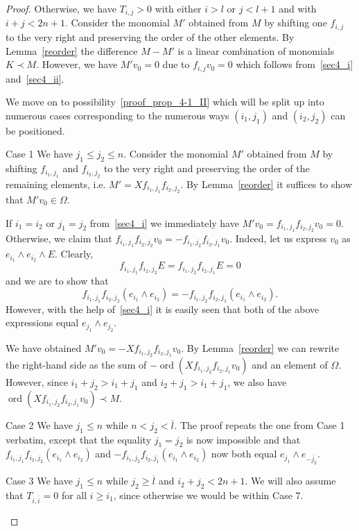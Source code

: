 \documentclass[ALCO,ThmDefs,Unicode]{cedram}
\DeclareMathOperator{\ord}{ord}
\begin{document}
\begin{proof}
Otherwise, we have $T_{i,j}>0$ with either $i>l$ or $j<l+1$ and with $i+j<2n+1$. Consider the monomial $M'$ obtained from $M$ by shifting one $f_{i,j}$ to the very right and preserving the order of the other elements. By Lemma~\ref{reorder} the difference $M-M'$ is a linear combination of monomials $K\prec M$. However, we have $M'v_0=0$ due to $f_{i,j}v_0=0$ which follows from~\ref{sec4_i} and~\ref{sec4_ii}.

We move on to possibility~\ref{proof_prop_4-1_II} which will be split up into numerous cases corresponding to the numerous ways $(i_1,j_1)$ and $(i_2,j_2)$ can be positioned.

\begin{enonce*}[remark]{Case 1} We have $j_1\le j_2\le n$. Consider the monomial $M'$ obtained from $M$ by shifting $f_{i_1,j_1}$ and $f_{i_2,j_2}$ to the very right and preserving the order of the remaining elements, i.e. $M'=X f_{i_1,j_1}f_{i_2,j_2}$. By Lemma~\ref{reorder} it suffices to show that $M'v_0\in\Omega$.

If $i_1=i_2$ or $j_1=j_2$ from~\ref{sec4_i} we immediately have $M'v_0=f_{i_1,j_1}f_{i_2,j_2}v_0=0$. Otherwise, we claim that $f_{i_1,j_1}f_{i_2,j_2} v_0=-f_{i_1,j_2}f_{i_2,j_1}v_0$. Indeed, let us express $v_0$ as $e_{i_1}\wedge e_{i_2}\wedge E$. Clearly,
\[
f_{i_1,j_1}f_{i_2,j_2} E=f_{i_1,j_2}f_{i_2,j_1}E=0
\]
and we are to show that
\[
f_{i_1,j_1}f_{i_2,j_2}(e_{i_1}\wedge e_{i_2})=-f_{i_1,j_2}f_{i_2,j_1}(e_{i_1}\wedge e_{i_2}).
\]
However, with the help of~\ref{sec4_i} it is easily seen that both of the above expressions equal $e_{j_1}\wedge e_{j_2}$.

We have obtained $M'v_0=-Xf_{i_1,j_2}f_{i_2,j_1}v_0$. By Lemma~\ref{reorder} we can rewrite the right-hand side as the sum of $-\ord(Xf_{i_1,j_2}f_{i_2,j_1}v_0)$ and an element of $\Omega$. However, since $i_1+j_2>i_1+j_1$ and $i_2+j_1>i_1+j_1$, we also have $\ord(Xf_{i_1,j_2}f_{i_2,j_1}v_0)\prec M$.
\end{enonce*}

\begin{enonce*}[remark]{Case 2} We have $j_1\le n$ while $n<j_2<\overline l$. The proof repeats the one from Case 1 verbatim, except that the equality $j_1=j_2$ is now impossible and that $f_{i_1,j_1}f_{i_2,j_2}(e_{i_1}\wedge e_{i_2})$ and $-f_{i_1,j_2}f_{i_2,j_1}(e_{i_1}\wedge e_{i_2})$ now both equal $e_{j_1}\wedge e_{-\overline{j_2}}$.
\end{enonce*}

\begin{enonce*}[remark]{Case 3} We have $j_1\le n$ while $j_2\ge\overline l$ and $i_2+j_2<2n+1$. We will also assume that $T_{i,\overline i}=0$ for all $i\ge i_1$, since otherwise we would be within Case 7.


\end{enonce*}
\end{proof}
\end{document}
